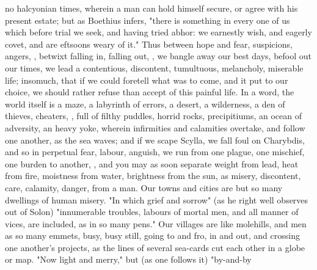 no halcyonian times, wherein a man can hold himself secure, or agree with his
present estate; but as Boethius infers, "there is
something in every one of us which before trial we seek, and having tried
abhor: we earnestly wish, and eagerly covet, and are
eftsoons weary of it." Thus between hope and fear, suspicions, angers,
,
betwixt falling in, falling out, \etc{}, we bangle away our best days, befool
out our times, we lead a contentious, discontent, tumultuous, melancholy,
miserable life; insomuch, that if we could foretell what was to come, and it
put to our choice, we should rather refuse than accept of this painful life. In
a word, the world itself is a maze, a labyrinth of errors, a desert, a
wilderness, a den of thieves, cheaters, \etc{}, full of filthy puddles, horrid
rocks, precipitiums, an ocean of adversity, an heavy yoke, wherein infirmities
and calamities overtake, and follow one another, as the sea waves; and if we
scape Scylla, we fall foul on Charybdis, and so in perpetual fear, labour,
anguish, we run from one plague, one mischief, one burden to another, , and you may as soon separate weight from lead, heat
from fire, moistness from water, brightness from the sun, as misery,
discontent, care, calamity, danger, from a man. Our towns and cities are but so
many dwellings of human misery. "In which grief and sorrow"
(as he right well observes out of Solon) "innumerable
troubles, labours of mortal men, and all manner of vices, are included, as in
so many pens." Our villages are like molehills, and men as so many emmets,
busy, busy still, going to and fro, in and out, and crossing one another's
projects, as the lines of several sea-cards cut each other in a globe or map.
"Now light and merry," but (as one follows it) "by-and-by
